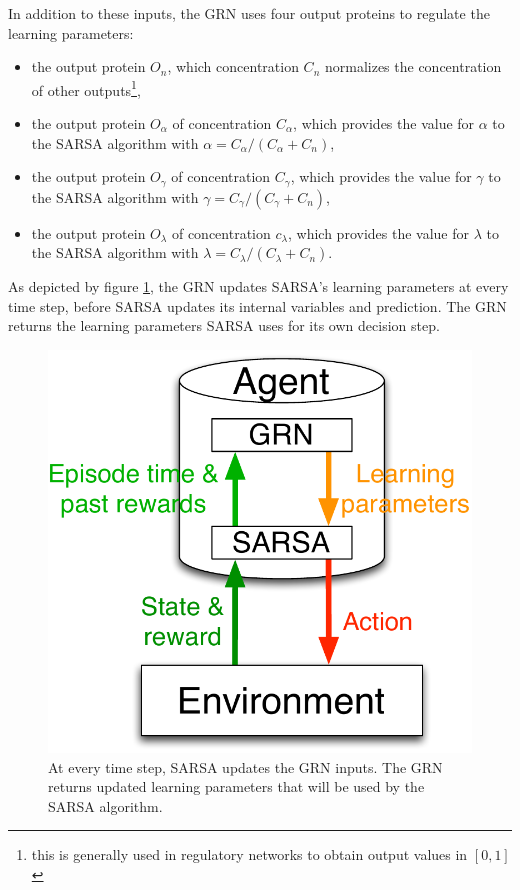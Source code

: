 In addition to these inputs, the GRN uses four output proteins to regulate the learning parameters:
\begin{itemize}
\item the output protein $O_{n}$, which concentration $C_{n}$ normalizes the concentration of other outputs\footnote{this is generally used in regulatory networks to obtain output values in $[0, 1]$},
\item the output protein $O_{\alpha}$ of concentration $C_{\alpha}$, which provides the value for $\alpha$ to the SARSA algorithm with $\alpha=C_{\alpha}/(C_\alpha+C_{n})$,
\item the output protein $O_\gamma$ of concentration $C_{\gamma}$, which provides the value for $\gamma$ to the SARSA algorithm with $\gamma=C_{\gamma}/(C_\gamma+C_{n})$,
\item the output protein $O_\lambda$ of concentration $c_{\lambda}$, which provides the value for $\lambda$ to the SARSA algorithm with $\lambda=C_{\lambda}/(C_\lambda+C_{n})$.
\end{itemize}

As depicted by figure \ref{fig:GRNSARSA}, the GRN updates SARSA's learning parameters at every time step, before SARSA updates its internal variables and prediction. The GRN returns the learning parameters SARSA uses for its own decision step.

\begin{figure}
\center
\includegraphics[width=0.7\linewidth]{GRNSARSA.pdf}
\caption{At every time step, SARSA updates the GRN inputs. The GRN returns updated learning parameters that will be used by the SARSA algorithm.}\label{fig:GRNSARSA}
\end{figure}

